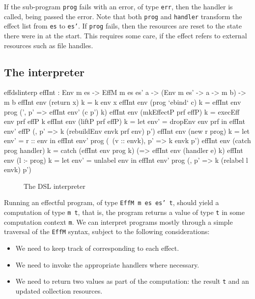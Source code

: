 \noindent
If the sub-program \texttt{prog} fails with an error, of type \texttt{err}, then
the handler is called, being passed the error. Note that both \texttt{prog}
and \texttt{handler} transform the effect list from \texttt{es} to \texttt{es'}.
If \texttt{prog} fails, then the resources are reset to the state there were in
at the start. This requires some care, if the effect refers to external
resources such as file handles.

\subsection{The \Eff{} interpreter}

\begin{SaveVerbatim}{effdslinterp}
effInt : Env m es -> EffM m es es' a -> (Env m es' -> a -> m b) -> m b
effInt env (return x) k = k env x
effInt env (prog `ebind` c) k = effInt env prog (\env', p' => effInt env' (c p') k)
effInt env (mkEffectP prf effP) k = execEff env prf effP k
effInt env (liftP prf effP) k = let env' = dropEnv env prf in 
                                    effInt env' effP (\envk, p' => k (rebuildEnv envk prf env) p')
effInt env (new r prog) k = let env' = r :: env in 
                                effInt env' prog (\ (v :: envk), p' => k envk p')
effInt env (catch prog handler) k = catch (effInt env prog k)
                                          (\e => effInt env (handler e) k)
effInt env (l :- prog) k = let env' = unlabel env in
                                      effInt env' prog (\envk, p' => k (relabel l envk) p')
\end{SaveVerbatim}

\begin{figure*}[t]
\begin{center}
\end{center}
\caption{The \Eff{} DSL interpreter}
\label{effdslimp}
\end{figure*}

Running an effectful program, of type \texttt{EffM m es es' t}, should yield
a computation of type \texttt{m t}, that is, the program returns a value of type
\texttt{t} in some computation context \texttt{m}. We can interpret programs
mostly through a simple traversal of the \texttt{EffM} syntax, subject to the
following considerations:

\begin{itemize}
\item We need to keep track of  corresponding to each effect.
\item We need to invoke the appropriate handlers where necessary.
\item We need to return two values as part of the computation: the result
\texttt{t} and an updated collection resources.
\end{itemize}

